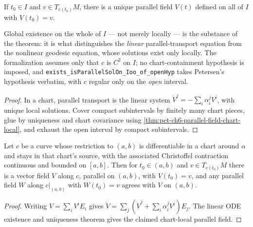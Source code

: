 \begin{theorem}
  \label{thm:pet-ch6-parallel-field-existence-uniqueness}


  If $t_0\in I$ and $v\in T_{c(t_0)}M$, there is a unique parallel field $V(t)$
  defined on all of $I$ with $V(t_0)=v$.

  Global existence on the whole of $I$ — not merely locally — is the substance of
  the theorem: it is what distinguishes the \emph{linear} parallel-transport
  equation from the nonlinear geodesic equation, whose solutions exist only
  locally. The formalization assumes only that $c$ is $C^2$ on $I$; no
  chart-containment hypothesis is imposed, and
  \texttt{exists\_isParallelSolOn\_Ioo\_of\_openHyp} takes Petersen's hypothesis
  verbatim, with $c$ regular only on the \emph{open} interval.
\end{theorem}
\begin{proof}

  \sketch
  In a chart, parallel transport is the linear system \(\dot V^j=-\sum_i\alpha_i^jV^i\), with unique local solutions. Cover compact subintervals by finitely many chart pieces, glue by uniqueness and chart covariance using \cref{thm:pet-ch6-parallel-field-chart-local}, and exhaust the open interval by compact subintervals.
\end{proof}

\begin{theorem}
  \label{thm:pet-ch6-parallel-field-chart-local}


  Let $c$ be a curve whose restriction to $(a,b)$ is differentiable in a chart
  around $\alpha$ and stays in that chart's source, with the associated
  Christoffel contraction continuous and bounded on $[a,b]$. Then for $t_0\in(a,b)$
  and $v\in T_{c(t_0)}M$ there is a vector field $V$ along $c$, parallel on
  $(a,b)$, with $V(t_0)=v$, and any parallel field $W$ along $c|_{(a,b)}$ with
  $W(t_0)=v$ agrees with $V$ on $(a,b)$.
\end{theorem}
\begin{proof}
  \sketch
  Writing \(V=\sum_iV^iE_i\) gives \(\dot V=\sum_j(\dot V^j+\sum_i\alpha_i^jV^i)E_j\). The linear ODE existence and uniqueness theorem gives the claimed chart-local parallel field.
\end{proof}

